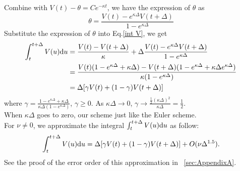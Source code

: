 \documentclass{ws-ijfe}
\begin{document}
Combine with $V(t)-\theta= Ce^{-\kappa t}$, we have the expression of $\theta$ as
\begin{equation*}
\theta=\frac{V(t)-e^{\kappa\Delta}V(t+\Delta)}{1-e^{\kappa\Delta}}
\end{equation*}
Substitute the expression of $\theta$ into Eq.\eqref{int V}, we get
\begin{equation*}
  \begin{split}
    \int_{t}^{t+\Delta}V(u)\mathrm{d} u &= \frac{V(t)-V(t+\Delta)}{\kappa}+\Delta\frac{V(t)-e^{\kappa\Delta}V(t+\Delta)}{1-e^{\kappa\Delta}}  \\
    &=\frac{V(t)(1-e^{\kappa\Delta}+\kappa\Delta)-V(t+\Delta)(1-e^{\kappa\Delta}+\kappa\Delta e^{\kappa\Delta})}{\kappa(1-e^{\kappa\Delta})} \\
     &=\Delta[\gamma V(t)+(1-\gamma) V(t+\Delta)]
  \end{split}
\end{equation*}
where
$\gamma = \frac{1-e^{\kappa\Delta}+\kappa\Delta}{\kappa\Delta(1-e^{\kappa\Delta})}$,
$\gamma\geq 0$.
As $\kappa\Delta\rightarrow 0$, $\gamma\rightarrow\frac{\frac{1}{2}(\kappa\Delta)^2}{\kappa\Delta}=\frac{1}{2} $.\\
When $\kappa\Delta$ goes to zero, our scheme just like the Euler scheme.\\
For $\nu\neq 0$, we approximate the integral $\int_{t}^{t+\Delta}V(u)\mathrm{d} u$ as follow:
\begin{equation*}
  \int_{t}^{t+\Delta}V(u)\mathrm{d} u = \Delta[\gamma V(t)+(1-\gamma) V(t+\Delta)] + O(\nu\Delta^{1.5}).
\end{equation*}
See the proof of the error order of this approximation in ~\ref{sec:AppendixA}.
\end{document}
